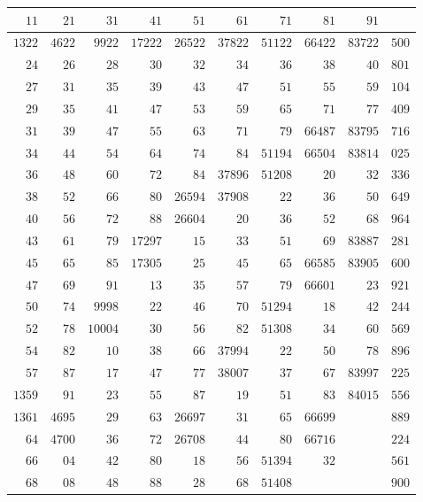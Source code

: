 \begin{longtable}{@{}r|r|r|r|r|r|r|r|r|r@{}}
\hline
$11$ & $21$ & $31$ & $41$ & $51$ & $61$ & $71$ & $81$ & $91$ & \\
\hline\endhead
$1322$ & $4622$ & $9922$ & $17222$ & $26522$ & $37822$ & $51122$ & $66422$ & $83722$ & $500$\\
$24$ & $26$ & $28$ & $30$ & $32$ & $34$ & $36$ & $38$ & $40$ & $801$\\
$27$ & $31$ & $35$ & $39$ & $43$ & $47$ & $51$ & $55$ & $59$ & $104$\\
$29$ & $35$ & $41$ & $47$ & $53$ & $59$ & $65$ & $71$ & $77$ & $409$\\
$31$ & $39$ & $47$ & $55$ & $63$ & $71$ & $79$ & $66487$ & $83795$ & $716$\\
$34$ & $44$ & $54$ & $64$ & $74$ & $84$ & $51194$ & $66504$ & $83814$ & $025$\\
$36$ & $48$ & $60$ & $72$ & $84$ & $37896$ & $51208$ & $20$ & $32$ & $336$\\
$38$ & $52$ & $66$ & $80$ & $26594$ & $37908$ & $22$ & $36$ & $50$ & $649$\\
$40$ & $56$ & $72$ & $88$ & $26604$ & $20$ & $36$ & $52$ & $68$ & $964$\\
$43$ & $61$ & $79$ & $17297$ & $15$ & $33$ & $51$ & $69$ & $83887$ & $281$\\
$45$ & $65$ & $85$ & $17305$ & $25$ & $45$ & $65$ & $66585$ & $83905$ & $600$\\
$47$ & $69$ & $91$ & $13$ & $35$ & $57$ & $79$ & $66601$ & $23$ & $921$\\
$50$ & $74$ & $9998$ & $22$ & $46$ & $70$ & $51294$ & $18$ & $42$ & $244$\\
$52$ & $78$ & $10004$ & $30$ & $56$ & $82$ & $51308$ & $34$ & $60$ & $569$\\
$54$ & $82$ & $10$ & $38$ & $66$ & $37994$ & $22$ & $50$ & $78$ & $896$\\
$57$ & $87$ & $17$ & $47$ & $77$ & $38007$ & $37$ & $67$ & $83997$ & $225$\\
$1359$ & $91$ & $23$ & $55$ & $87$ & $19$ & $51$ & $83$ & $84015$ & $556$\\
$1361$ & $4695$ & $29$ & $63$ & $26697$ & $31$ & $65$ & $66699$ &  & $889$\\
$64$ & $4700$ & $36$ & $72$ & $26708$ & $44$ & $80$ & $66716$ &  & $224$\\
$66$ & $04$ & $42$ & $80$ & $18$ & $56$ & $51394$ & $32$ &  & $561$\\
$68$ & $08$ & $48$ & $88$ & $28$ & $68$ & $51408$ &  &  & $900$\\

\end{longtable}
